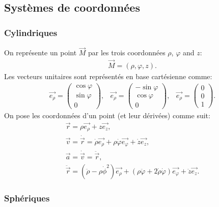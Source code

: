 
\begin{multicols}{2}

    \subsection{Systèmes de coordonnées}
    
    \subsubsection*{Cylindriques}
    On représente un point $\vec{M}$ par les trois coordonnées $\rho$, $\varphi$ and $z$:
    \begin{align*}
        \vec{M} = (\rho, \varphi, z).
    \end{align*}
    Les vecteurs unitaires sont représentés en base cartésienne comme:
    \begin{align*}
        \vec{e_\rho} = \begin{pmatrix} 
            \cos \varphi \\
            \sin \varphi \\
            0
        \end{pmatrix}, & 
        \vec{e_\rho} = \begin{pmatrix} 
            - \sin \varphi \\
            \cos \varphi \\
            0
        \end{pmatrix}, & 
        \vec{e_\rho} = \begin{pmatrix} 
            0 \\
            0 \\
            1
        \end{pmatrix}.
    \end{align*}
    On pose les coordonnées d'un point (et leur dérivées) comme suit: 
    \begin{align*}
        \vec{r} = \rho \vec{e_\rho} + z \vec{e_z}, \\
        \vec{v} = \dot{\vec{r}} = \dot{\rho} \vec{e_\rho} + \rho \dot{\varphi} \vec{e_\varphi} + \dot{z} \vec{e_z}, \\
        \vec{a} = \dot{\vec{v}} = \ddot{\vec{r}}, \\
        \ddot{\vec{r}} = (\ddot{\rho} - \rho \dot{\phi}^2) \vec{e_\rho} + (\rho \ddot{\varphi} + 2 \dot{\rho} \dot{\varphi}) \vec{e_\varphi} + \ddot{z} \vec{e_z}.
    \end{align*}
    
    \subsubsection*{Sphériques}
    

\end{multicols}
